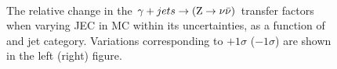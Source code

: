 \begin{figure}[]
  \centering
   ~~
  \\

  \caption{\label{fig:tfSyst_jec_gjToZinv} The relative change in the
  $\gj \rightarrow (\znunu)$ transfer
  factors when varying JEC in MC within its uncertainties, as a function of \scalht and jet category. 
  Variations corresponding to $+1\sigma$ ($-1\sigma$) are shown in the left (right) figure. 
  }
\end{figure}

